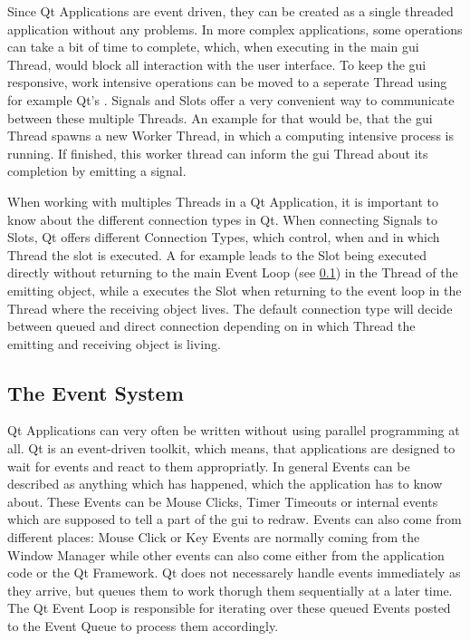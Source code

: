 Since Qt Applications are event driven, they can be created as a single threaded application without any problems. In more complex applications, some operations can take a bit of time to complete, which, when executing in the main \gls{gui} Thread, would block all interaction with the user interface. To keep the \gls{gui} responsive, work intensive operations can be moved to a seperate Thread using for example Qt's . Signals and Slots offer a very convenient way to communicate between these multiple Threads. An example for that would be, that the \gls{gui} Thread spawns a new Worker Thread, in which a computing intensive process is running. If finished, this worker thread can inform the \gls{gui} Thread about its completion by emitting a signal.

When working with multiples Threads in a Qt Application, it is important to know about the different connection types in Qt. When connecting Signals to Slots, Qt offers different Connection Types, which control, when and in which Thread the slot is executed. A  for example leads to the Slot being executed directly without returning to the main Event Loop (see \ref{sec:fundamentals:qt:eventloop}) in the Thread of the emitting object, while a  executes the Slot when returning to the event loop in the Thread where the receiving object lives. The default connection type  will decide between queued and direct connection depending on in which Thread the emitting and receiving object is living.
\cite{QtConnectionTypes}





\subsection{The Event System}
\label{sec:fundamentals:qt:eventloop}

Qt Applications can very often be written without using parallel programming at all. Qt is an event-driven toolkit, which means, that applications are designed to wait for events and react to them appropriatly. In general Events can be described as anything which has happened, which the application has to know about.
These Events can be Mouse Clicks, Timer Timeouts or internal events which are supposed to tell a part of the \gls{gui} to redraw. Events can also come from different places: Mouse Click or Key Events are normally coming from the Window Manager while other events can also come either from the application code or the Qt Framework.
Qt does not necessarely handle events immediately as they arrive, but queues them to work thorugh them sequentially at a later time. The Qt Event Loop is responsible for iterating over these queued Events posted to the Event Queue to process them accordingly.

